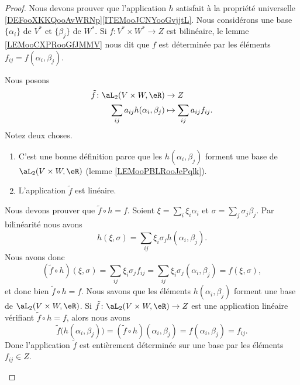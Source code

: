 \begin{proof}
	Nous devons prouver que l'application \( h\) satisfait à la propriété universelle \ref{DEFooXKKQooAvWRNp}\ref{ITEMooJCNYooGvjjtL}. Nous considérons une base \( \{ \alpha_i \}\) de \( V^*\) et \( \{ \beta_j \}\) de \( W^*\). Si \(f \colon V^*\times W^*\to Z  \) est bilinéaire, le lemme \ref{LEMooCXPRooGfJMMV} nous dit que \( f\) est déterminée par les éléments \(f_{ij}= f(\alpha_i,\beta_j)\).

	\begin{subproof}
		\spitem[Existence]
		Nous posons
		\begin{equation}
			\begin{aligned}
				\tilde f\colon \aL_2(V\times W,\eR) & \to Z                          \\
				\sum_{ij}a_{ij}h(\alpha_i,\beta_j)  & \mapsto \sum_{ij}a_{ij}f_{ij}.
			\end{aligned}
		\end{equation}
		Notez deux choses.
		\begin{enumerate}
			\item
			      C'est une bonne définition parce que les \( h(\alpha_i,\beta_j)\) forment une base de \( \aL_2(V\times W,\eR)\) (lemme \ref{LEMooPBLRooJePqlk}).
			\item
			      L'application \( \tilde  f\) est linéaire.
		\end{enumerate}

		Nous devons prouver que \( \tilde f\circ h=f\). Soient \( \xi=\sum_i\xi_i\alpha_i\) et \( \sigma=\sum_j\sigma_j\beta_j\). Par bilinéarité nous avons
		\begin{equation}
			h(\xi,\sigma)=\sum_{ij}\xi_i\sigma_jh(\alpha_i,\beta_j).
		\end{equation}
		Nous avons donc
		\begin{equation}
			(\tilde f\circ h)(\xi,\sigma)=\sum_{ij}\xi_i\sigma_jf_{ij}=\sum_{ij}\xi_i\sigma_j(\alpha_i,\beta_j)=f(\xi,\sigma),
		\end{equation}
		et donc bien \( \tilde f\circ h=f\).
		\spitem[Unicité]
		Nous savons que les éléments \( h(\alpha_i,\beta_j)\) forment une base de \( \aL_2(V\times W,\eR)\). Si \(\tilde f \colon \aL_2(V\times W,\eR)\to Z  \) est une application linéaire vérifiant \( \tilde f\circ h=f\), alors nous avons
		\begin{equation}
			\tilde f\big( h(\alpha_i,\beta_j) \big)=(\tilde f\circ h)(\alpha_i,\beta_j)=f(\alpha_i,\beta_j)=f_{ij}.
		\end{equation}
		Donc l'application \( \tilde f \) est entièrement déterminée sur une base par les éléments \( f_{ij}\in Z\).
	\end{subproof}
\end{proof}

